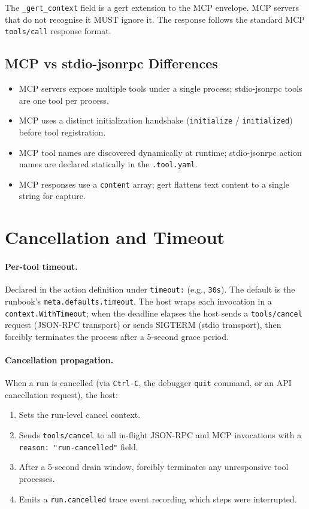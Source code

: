 The \texttt{\_gert\_context} field is a gert extension to the MCP envelope.
MCP servers that do not recognise it MUST ignore it.  The response follows the
standard MCP \texttt{tools/call} response format.

\subsection{MCP vs stdio-jsonrpc Differences}

\begin{itemize}
  \item MCP servers expose multiple tools under a single process; stdio-jsonrpc
        tools are one tool per process.
  \item MCP uses a distinct initialization handshake (\texttt{initialize} /
        \texttt{initialized}) before tool registration.
  \item MCP tool names are discovered dynamically at runtime; stdio-jsonrpc
        action names are declared statically in the \texttt{.tool.yaml}.
  \item MCP responses use a \texttt{content} array; gert flattens text content
        to a single string for capture.
\end{itemize}

\section{Cancellation and Timeout}
\label{sec:tool-cancellation}

\paragraph{Per-tool timeout.}
Declared in the action definition under \texttt{timeout:} (e.g., \texttt{30s}).
The default is the runbook's \texttt{meta.defaults.timeout}.  The host wraps
each invocation in a \texttt{context.WithTimeout}; when the deadline elapses
the host sends a \texttt{tools/cancel} request (JSON-RPC transport) or
sends SIGTERM (stdio transport), then forcibly terminates the process after a
5-second grace period.

\paragraph{Cancellation propagation.}
When a run is cancelled (via \texttt{Ctrl-C}, the debugger \texttt{quit}
command, or an API cancellation request), the host:

\begin{enumerate}
  \item Sets the run-level cancel context.
  \item Sends \texttt{tools/cancel} to all in-flight JSON-RPC and MCP
        invocations with a \texttt{reason: "run-cancelled"} field.
  \item After a 5-second drain window, forcibly terminates any unresponsive
        tool processes.
  \item Emits a \texttt{run.cancelled} trace event recording which steps were
        interrupted.
\end{enumerate}

